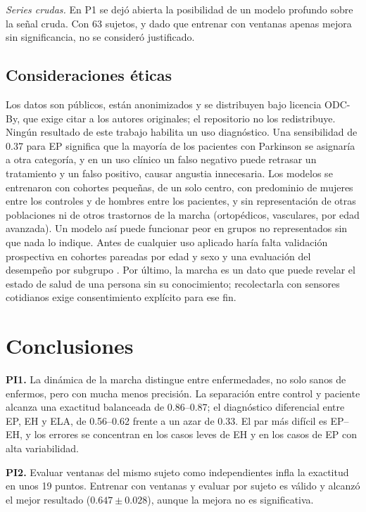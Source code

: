 \documentclass[conference]{IEEEtran}
\begin{document}
\textit{Series crudas.} En P1 se dejó abierta la posibilidad de un modelo profundo sobre la señal cruda. Con 63 sujetos, y dado que entrenar con ventanas apenas mejora sin significancia, no se consideró justificado.

\subsection{Consideraciones éticas}
Los datos son públicos, están anonimizados y se distribuyen bajo licencia ODC-By, que exige citar a los autores originales; el repositorio no los redistribuye. Ningún resultado de este trabajo habilita un uso diagnóstico. Una sensibilidad de 0.37 para EP significa que la mayoría de los pacientes con Parkinson se asignaría a otra categoría, y en un uso clínico un falso negativo puede retrasar un tratamiento y un falso positivo, causar angustia innecesaria. Los modelos se entrenaron con cohortes pequeñas, de un solo centro, con predominio de mujeres entre los controles y de hombres entre los pacientes, y sin representación de otras poblaciones ni de otros trastornos de la marcha (ortopédicos, vasculares, por edad avanzada). Un modelo así puede funcionar peor en grupos no representados sin que nada lo indique. Antes de cualquier uso aplicado haría falta validación prospectiva en cohortes pareadas por edad y sexo y una evaluación del desempeño por subgrupo \cite{collins2015}. Por último, la marcha es un dato que puede revelar el estado de salud de una persona sin su conocimiento; recolectarla con sensores cotidianos exige consentimiento explícito para ese fin.

\section{Conclusiones}

\textbf{PI1.} La dinámica de la marcha distingue entre enfermedades, no solo sanos de enfermos, pero con mucha menos precisión. La separación entre control y paciente alcanza una exactitud balanceada de 0.86--0.87; el diagnóstico diferencial entre EP, EH y ELA, de 0.56--0.62 frente a un azar de 0.33. El par más difícil es EP--EH, y los errores se concentran en los casos leves de EH y en los casos de EP con alta variabilidad.

\textbf{PI2.} Evaluar ventanas del mismo sujeto como independientes infla la exactitud en unos 19 puntos. Entrenar con ventanas y evaluar por sujeto es válido y alcanzó el mejor resultado ($0.647 \pm 0.028$), aunque la mejora no es significativa.
\end{document}
